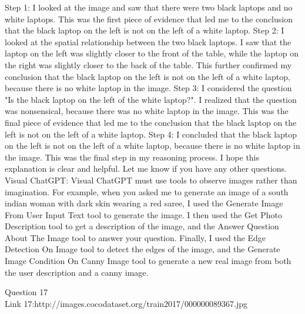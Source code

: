 \begin{enumerate}
        Step 1: I looked at the image and saw that there were two black laptops and no white laptops. This was the first piece of evidence that led me to the conclusion that the black laptop on the left is not on the left of a white laptop.
        Step 2: I looked at the spatial relationship between the two black laptops. I saw that the laptop on the left was slightly closer to the front of the table, while the laptop on the right was slightly closer to the back of the table. This further confirmed my conclusion that the black laptop on the left is not on the left of a white laptop, because there is no white laptop in the image.
        Step 3: I considered the question "Is the black laptop on the left of the white laptop?". I realized that the question was nonsensical, because there was no white laptop in the image. This was the final piece of evidence that led me to the conclusion that the black laptop on the left is not on the left of a white laptop.
        Step 4: I concluded that the black laptop on the left is not on the left of a white laptop, because there is no white laptop in the image. This was the final step in my reasoning process.
        I hope this explanation is clear and helpful. Let me know if you have any other questions.
        \subitem Visual ChatGPT: Visual ChatGPT must use tools to observe images rather than imagination. For example, when you asked me to generate an image of a south indian woman with dark skin wearing a red saree, I used the Generate Image From User Input Text tool to generate the image. I then used the Get Photo Description tool to get a description of the image, and the Answer Question About The Image tool to answer your question. Finally, I used the Edge Detection On Image tool to detect the edges of the image, and the Generate Image Condition On Canny Image tool to generate a new real image from both the user description and a canny image.
    \end{enumerate}
Question 17\\
Link 17:http://images.cocodataset.org/train2017/000000089367.jpg
